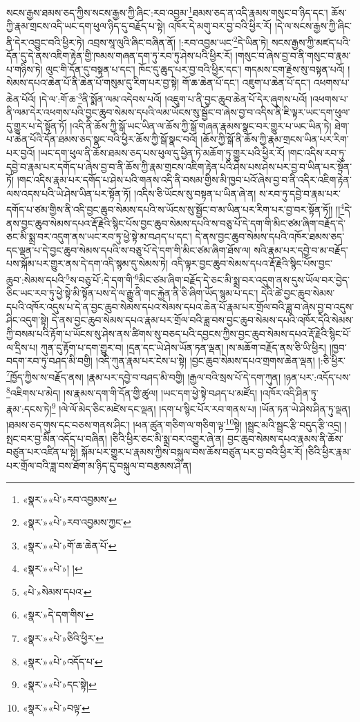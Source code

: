 སངས་རྒྱས་ཐམས་ཅད་ཀྱིས་སངས་རྒྱས་ཀྱི་ཞིང་:རབ་འབྱམ་\footnote{«སྣར་»«པེ་»རབ་འབྱམས་}ཐམས་ཅད་ན་འདི་རྣམས་གསུང་བ་ཉིད་དང་། ཆོས་ཀྱི་རྣམ་གྲངས་འདི་ཡང་དག་ཕུལ་ཉིད་དུ་བརྗོད་པ་སྟེ། འཁོར་དེ་མགུ་བར་བྱ་བའི་ཕྱིར་རོ། །དེ་ལ་སངས་རྒྱས་ཀྱི་ཞིང་ནི་དེར་འབྱུང་བའི་ཕྱིར་ཏེ། འབྲས་སཱ་ལུའི་ཞིང་བཞིན་ནོ། །:རབ་འབྱམ་ཡང་\footnote{«སྣར་»«པེ་»རབ་འབྱམས་ཀྱང་}དེ་ཡིན་ཏེ། སངས་རྒྱས་ཀྱི་མཛད་པའི་དོན་དུ་དེ་ནས་འཇིག་རྟེན་གྱི་ཁམས་གཞན་དག་ཏུ་རབ་ཏུ་ཤེས་པའི་ཕྱིར་རོ། །གསུང་བ་ཞེས་བྱ་བ་ནི་གསུང་བ་རྣམ་པ་གཉིས་ཏེ། ལུང་གི་དོན་དུ་བསྟན་པ་དང་། ཁོང་དུ་ཆུད་པར་བྱ་བའི་ཕྱིར་དང་། གདམས་ངག་རྗེས་སུ་བསྟན་པའོ། །སེམས་དཔའ་ཆེན་པོ་ནི་ཆེན་པོ་གསུམ་དུ་རིག་པར་བྱ་སྟེ། གོ་ཆ་ཆེན་པོ་དང་། འཇུག་པ་ཆེན་པོ་དང་། འཕགས་པ་ཆེན་པོའོ། །དེ་ལ་:གོ་ཆ་\footnote{«སྣར་»«པེ་»གོ་ཆ་ཆེན་པོ་}ནི་སྨོན་ལམ་འདེབས་པའོ། །འཇུག་པ་ནི་བྱང་ཆུབ་ཆེན་པོ་དེར་ཞུགས་པའོ། །འཕགས་པ་ནི་ལམ་དེར་འཕགས་པའི་བྱང་ཆུབ་སེམས་དཔའི་ལམ་ཡོངས་སུ་སྦྱོང་བ་ཞེས་བྱ་བ་འདིས་ནི་ཇི་ལྟར་ཡང་དག་ཕུལ་དུ་གྱུར་པ་དེ་སྟོན་ཏོ། །འདི་ནི་ཆོས་ཀྱི་སྒོ་ཡང་ཡིན་ལ་ཆོས་ཀྱི་སྒོ་གཞན་རྣམས་སྣང་བར་གྱུར་པ་ཡང་ཡིན་ཏེ། ཐེག་པ་ཆེན་པོའི་དོན་ཐམས་ཅད་སྣང་བའི་ཕྱིར་ཆོས་ཀྱི་སྒོ་སྣང་བའོ། །ཆོས་ཀྱི་སྒོ་ནི་ཆོས་ཀྱི་རྣམ་གྲངས་ཡིན་པར་རིག་པར་བྱའོ། །ཡང་དག་ཕུལ་ནི་ཆོས་ཐམས་ཅད་པས་ཕུལ་དུ་ཕྱིན་ཏེ་མཆོག་ཏུ་གྱུར་པའི་ཕྱིར་རོ། །གང་འདིས་རབ་ཏུ་དབྱེ་བ་རྣམ་པར་དགོད་པ་ཞེས་བྱ་བ་ནི་ཆོས་ཀྱི་རྣམ་གྲངས་འཇིག་རྟེན་པའི་ཤེས་པས་ཤེས་པར་བྱ་བ་ཡིན་པར་སྟོན་ཏོ། །གང་འདིས་རྣམ་པར་དགོད་པ་ཤེས་པའི་གནས་འདི་ནི་བསམ་གྱིས་མི་ཁྱབ་པའོ་ཞེས་བྱ་བ་ནི་འདིར་འཇིག་རྟེན་ལས་འདས་པའི་ཡེ་ཤེས་ཡིན་པར་སྟོན་ཏོ། །འདིས་ཅི་ཡོངས་སུ་བསྟན་པ་ཡིན་ཞེ་ན། ས་རབ་ཏུ་དབྱེ་བ་རྣམ་པར་དགོད་པ་ཙམ་གྱིས་ནི་འདི་བྱང་ཆུབ་སེམས་དཔའི་ས་ཡོངས་སུ་སྦྱོང་བ་མ་ཡིན་པར་རིག་པར་བྱ་བར་སྟོན་ཏོ།། །།\footnote{«སྣར་»«པེ་»། །}དེ་ནས་བྱང་ཆུབ་སེམས་དཔའ་རྡོ་རྗེའི་སྙིང་པོས་བྱང་ཆུབ་སེམས་དཔའི་ས་བཅུ་པོ་དེ་དག་གི་མིང་ཙམ་ཞིག་བརྗོད་དེ་ཅང་མི་སྨྲ་བར་འདུག་ནས་ཡང་རབ་ཏུ་ཕྱེ་སྟེ་མ་བཤད་པ་དང་། དེ་ནས་བྱང་ཆུབ་སེམས་དཔའི་འཁོར་ཐམས་ཅད་དང་ལྡན་པ་དེ་བྱང་ཆུབ་སེམས་དཔའི་ས་བཅུ་པོ་དེ་དག་གི་མིང་ཙམ་ཞིག་ཐོས་ལ། སའི་རྣམ་པར་དབྱེ་བ་མ་བརྗོད་པས་སྐོམ་པར་གྱུར་ནས་དེ་དག་འདི་སྙམ་དུ་སེམས་ཏེ། འདི་ལྟར་བྱང་ཆུབ་སེམས་དཔའ་རྡོ་རྗེའི་སྙིང་པོས་བྱང་ཆུབ་:སེམས་དཔའི་\footnote{«པེ་»སེམས་དཔའ་}ས་བཅུ་པོ་:དེ་དག་གི་\footnote{«སྣར་»དེ་དག་གིས་}མིང་ཙམ་ཞིག་བརྗོད་དེ་ཅང་མི་སྨྲ་བར་འདུག་ནས་དུས་ཡོལ་བར་བྱེད་ཅིང་ཡང་རབ་ཏུ་ཕྱེ་སྟེ་མི་སྟོན་པས་དེ་ལ་རྒྱུ་ནི་གང་རྐྱེན་ནི་ཅི་ཞིག་ཡོད་སྙམ་པ་དང་། དེའི་ཚེ་བྱང་ཆུབ་སེམས་དཔའི་འཁོར་འདུས་པ་དེ་ན་བྱང་ཆུབ་སེམས་དཔའ་སེམས་དཔའ་ཆེན་པོ་རྣམ་པར་གྲོལ་བའི་ཟླ་བ་ཞེས་བྱ་བ་འདུས་ཤིང་འདུག་སྟེ། དེ་ནས་བྱང་ཆུབ་སེམས་དཔའ་རྣམ་པར་གྲོལ་བའི་ཟླ་བས་བྱང་ཆུབ་སེམས་དཔའི་འཁོར་དེའི་སེམས་ཀྱི་བསམ་པའི་རྟོག་པ་ཡོངས་སུ་ཤེས་ནས་ཚིགས་སུ་བཅད་པའི་དབྱངས་ཀྱིས་བྱང་ཆུབ་སེམས་དཔའ་རྡོ་རྗེའི་སྙིང་པོ་ལ་དྲིས་པ། ཀུན་དུ་རྟོག་པ་དག་གྱུར་བ། །དྲན་དང་ཡེ་ཤེས་ཡོན་ཏན་ལྡན། །ས་མཆོག་བརྗོད་ནས་ཅི་ཡི་ཕྱིར། །ཁྱབ་བདག་རབ་ཏུ་བཤད་མི་བགྱི། །འདི་ཀུན་རྣམ་པར་ངེས་པ་སྟེ། །བྱང་ཆུབ་སེམས་དཔའ་གྲགས་ཆེན་ལྡན། །:ཅི་ཕྱིར་\footnote{«སྣར་»«པེ་»ཅིའི་ཕྱིར་}ཁྱོད་ཀྱིས་ས་བརྗོད་ནས། །རྣམ་པར་དབྱེ་བ་བཤད་མི་བགྱི། །རྒྱལ་བའི་སྲས་པོ་དེ་དག་ཀུན། །ཉན་པར་:འདོད་པས་\footnote{«སྣར་»«པེ་»འདོད་པ་}འཇིགས་པ་མེད། །ས་རྣམས་དག་གི་དོན་གྱི་ཚུལ། །ཡང་དག་ཕྱེ་སྟེ་བཤད་པ་མཛོད། །འཁོར་འདི་ཤིན་ཏུ་རྣམ་:དངས་ཏེ།\footnote{«སྣར་»«པེ་»དང་སྟེ།} །ལེ་ལོ་མེད་ཅིང་མཛེས་དང་ལྡན། །དག་པ་སྙིང་པོར་རབ་གནས་པ། །ཡོན་ཏན་ཡེ་ཤེས་ཤིན་ཏུ་ལྡན། །ཐམས་ཅད་གུས་དང་བཅས་གནས་ཤིང་། །ཕན་ཚུན་གཅིག་ལ་གཅིག་ལྟ་\footnote{«སྣར་»«པེ་»བལྟ་}སྟེ། །སྦྲང་མའི་སྦྲང་རྩི་བདུད་རྩི་འདྲ། །སྤང་བར་བྱ་མིན་འདོད་པ་བཞིན། །ཅིའི་ཕྱིར་ཅང་མི་སྨྲ་བར་འགྱུར་ཞེ་ན། བྱང་ཆུབ་སེམས་དཔའ་རྣམས་ནི་ཆོས་བཙུན་པར་འཛིན་པ་སྟེ། སྐོམ་པར་གྱུར་པ་རྣམས་ཀྱིས་བསྐུལ་བས་ཆོས་བཙུན་པར་བྱ་བའི་ཕྱིར་རོ། །ཅིའི་ཕྱིར་རྣམ་པར་གྲོལ་བའི་ཟླ་བས་ཐོག་མ་ཉིད་དུ་བསྐུལ་བ་བརྩམས་ཤེ་ན། 